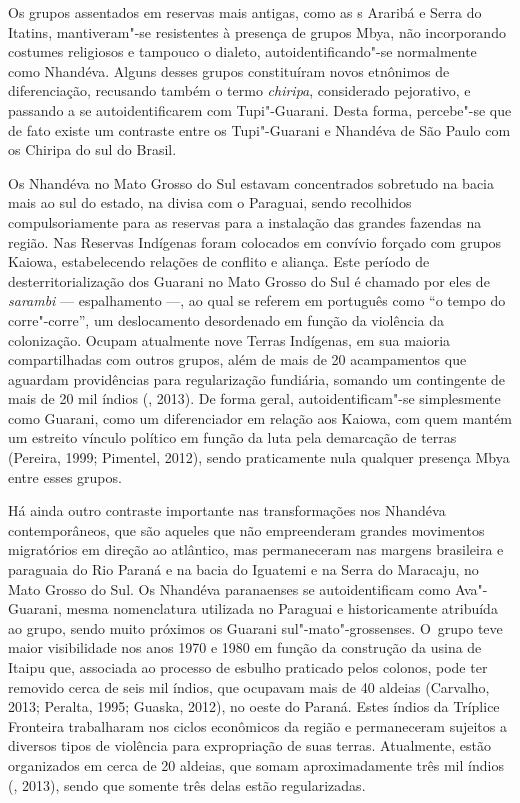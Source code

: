 Os grupos assentados em reservas mais antigas, como as s Araribá e
Serra do Itatins, mantiveram"-se resistentes à presença de grupos Mbya,
não incorporando costumes religiosos e tampouco o dialeto,
autoidentificando"-se normalmente como Nhandéva. Alguns desses grupos
constituíram novos etnônimos de diferenciação, recusando também o termo
\emph{chiripa}, considerado pejorativo, e passando a se autoidentificarem com
Tupi"-Guarani. Desta forma, percebe"-se que de fato existe um contraste
entre os Tupi"-Guarani e Nhandéva de São Paulo com os Chiripa do sul do
Brasil.

Os Nhandéva no Mato Grosso do Sul estavam concentrados sobretudo na
bacia mais ao sul do estado, na divisa com o Paraguai, sendo recolhidos
compulsoriamente para as reservas para a instalação das grandes
fazendas na região. Nas Reservas Indígenas foram colocados em convívio
forçado com grupos Kaiowa, estabelecendo relações de conflito e
aliança. Este período de desterritorialização dos Guarani no Mato
Grosso do Sul é chamado por eles de \emph{sarambi} --- espalhamento ---, ao qual
se referem em português como ``o tempo do corre"-corre'', um deslocamento
desordenado em função da violência da colonização. Ocupam atualmente
nove Terras Indígenas, em sua maioria compartilhadas com outros grupos,
além de mais de 20 acampamentos que aguardam providências para
regularização fundiária, somando um contingente de mais de 20 mil
índios (, 2013). De forma geral, autoidentificam"-se simplesmente
como Guarani, como um diferenciador em relação aos Kaiowa, com quem
mantém um estreito vínculo político em função da luta pela demarcação
de terras (Pereira, 1999; Pimentel, 2012), sendo praticamente nula
qualquer presença Mbya entre esses grupos.

Há ainda outro contraste importante nas transformações nos Nhandéva
contemporâneos, que são aqueles que não empreenderam grandes movimentos
migratórios em direção ao atlântico, mas permaneceram nas margens
brasileira e paraguaia do Rio Paraná e na bacia do Iguatemi e na Serra
do Maracaju, no Mato Grosso do Sul. Os Nhandéva paranaenses se
autoidentificam como Ava"-Guarani, mesma nomenclatura utilizada no
Paraguai e historicamente atribuída ao grupo, sendo muito próximos os
Guarani sul"-mato"-grossenses. O~grupo teve maior visibilidade nos anos
1970 e 1980 em função da construção da usina de Itaipu que, associada
ao processo de esbulho praticado pelos colonos, pode ter removido cerca
de seis mil índios, que ocupavam mais de 40 aldeias (Carvalho, 2013;
Peralta, 1995; Guaska, 2012), no oeste do Paraná. Estes índios da
Tríplice Fronteira trabalharam nos ciclos econômicos da região e
permaneceram sujeitos a diversos tipos de violência para expropriação
de suas terras. Atualmente, estão organizados em cerca de 20 aldeias,
que somam aproximadamente três mil índios (, 2013), sendo que
somente três delas estão regularizadas.

